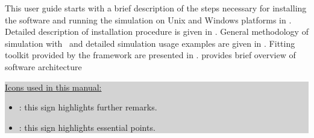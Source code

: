 


This user guide starts with a brief description of the steps necessary for 
installing the software and running the simulation 
on Unix and Windows platforms in .
Detailed description of installation procedure is given in .
General methodology of simulation with \BornAgain\ and detailed simulation usage examples are given in .
Fitting toolkit provided by the framework are presented in .
 provides brief overview of software architecture


\vspace*{2mm}

\colorbox{Lightgray}{\parbox{0.95\linewidth}
{
\noindent \underline{Icons used in this manual:}
\begin{itemize}
\item[] \smallpencil: this sign highlights further remarks.
\item[] {\huge\danger}: this sign highlights essential points.
\end{itemize}
}
}

